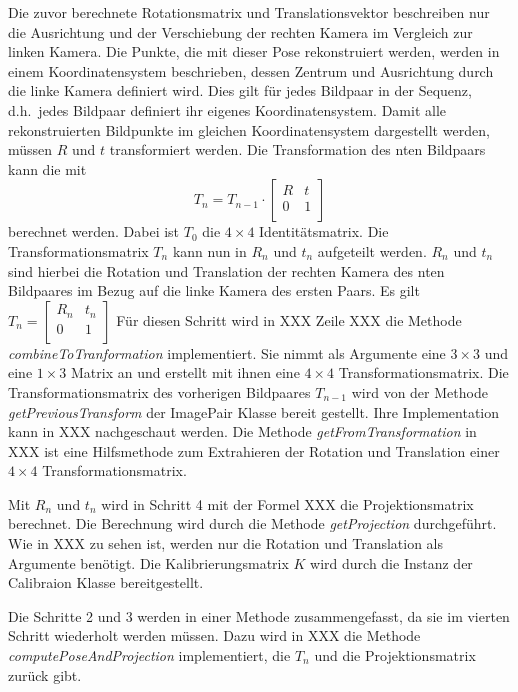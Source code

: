 Die zuvor berechnete Rotationsmatrix und Translationsvektor beschreiben nur die Ausrichtung und der Verschiebung der rechten Kamera im Vergleich zur linken Kamera.
Die Punkte, die mit dieser Pose rekonstruiert werden, werden in einem Koordinatensystem beschrieben, dessen Zentrum und Ausrichtung durch die linke Kamera definiert wird.
Dies gilt für jedes Bildpaar in der Sequenz, d.h.\ jedes Bildpaar definiert ihr eigenes Koordinatensystem.
Damit alle rekonstruierten Bildpunkte im gleichen Koordinatensystem dargestellt werden, müssen $R$ und $t$ transformiert werden.
Die Transformation des nten Bildpaars kann die mit 
\[ T_n = T_{n-1} \cdot \begin{bmatrix}
            R & t \\
            0 & 1 \\
        \end{bmatrix}
    \] 
berechnet werden.
Dabei ist $T_0$ die $4 \times 4$ Identitätsmatrix.
Die Transformationsmatrix $T_n$ kann nun in $R_n$ und $t_n$ aufgeteilt werden. 
$R_n$ und $t_n$ sind hierbei die Rotation und Translation der rechten Kamera des nten Bildpaares im Bezug auf die linke Kamera des ersten Paars.
Es gilt $T_n = \begin{bmatrix}
                R_n & t_n \\
                0 & 1 \\
            \end{bmatrix}$
Für diesen Schritt wird in XXX Zeile XXX die Methode \emph{combineToTranformation} implementiert.
Sie nimmt als Argumente eine $3 \times 3$ und eine $1\times3$ Matrix an und erstellt mit ihnen eine 
$4\times4$ Transformationsmatrix.
Die Transformationsmatrix des vorherigen Bildpaares $T_{n-1}$ wird von der Methode \emph{getPreviousTransform} der ImagePair Klasse bereit gestellt.
Ihre Implementation kann in XXX nachgeschaut werden.
Die Methode \emph{getFromTransformation} in XXX ist eine Hilfsmethode zum Extrahieren der Rotation und Translation einer $4\times4$ Transformationsmatrix.

Mit $R_n$ und $t_n$ wird in Schritt 4 mit der Formel XXX die Projektionsmatrix berechnet.
Die Berechnung wird durch die Methode \emph{getProjection} durchgeführt.
Wie in XXX zu sehen ist, werden nur die Rotation und Translation als Argumente benötigt.
Die Kalibrierungsmatrix $K$ wird durch die Instanz der Calibraion Klasse bereitgestellt. 

Die Schritte 2 und 3 werden in einer Methode zusammengefasst, da sie im vierten Schritt wiederholt werden müssen.
Dazu wird in XXX die Methode \emph{computePoseAndProjection} implementiert, die $T_n$ und die Projektionsmatrix zurück gibt.

